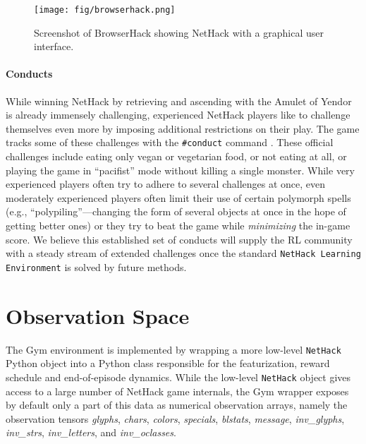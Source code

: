 \documentclass{article}
\newcommand{\nethackenv}{\texttt{NetHack Learning Environment}}
\begin{document}
\begin{center}
\begin{figure}[h]
    \centering
    \texttt{[image: fig/browserhack.png]}
    \caption{Screenshot of BrowserHack showing NetHack with a graphical user interface.}
    \label{fig:browserhack}
\end{figure}
\end{center}

\paragraph{Conducts}
While winning NetHack by retrieving and ascending with the Amulet of Yendor is already immensely challenging, experienced NetHack players like to challenge themselves even more by imposing additional restrictions on their play.
The game tracks some of these challenges with the \texttt{\#conduct}
command \citep{raymond2020guide}.  These official challenges include eating
only vegan or vegetarian food, or not eating at all, or playing the
game in ``pacifist'' mode without killing a single monster.  While
very experienced players often try to adhere to several challenges at
once, even moderately experienced players often limit their use
of certain polymorph spells (e.g., ``polypiling''---changing the form
of several objects at once in the hope of getting better ones) or they
try to beat the game while \emph{minimizing} the in-game score.  We
believe this established set of conducts will supply the RL community
with a steady stream of extended challenges once the standard \nethackenv{} is solved by future methods.





\section{Observation Space}
\label{sec:observation}

The Gym environment is implemented by wrapping a more
low-level \texttt{NetHack} Python object into a Python class
responsible for the featurization, reward schedule and end-of-episode
dynamics. While the low-level \texttt{NetHack} object gives access to a large
number of NetHack game internals, the Gym wrapper exposes by default
only a part of this data as numerical observation arrays, namely the
observation tensors
\textit{glyphs}, \textit{chars}, \textit{colors}, \textit{specials},
\textit{blstats}, \textit{message}, \textit{inv\_glyphs}, \textit{inv\_strs},
\textit{inv\_letters}, and \textit{inv\_oclasses}.
\end{document}
